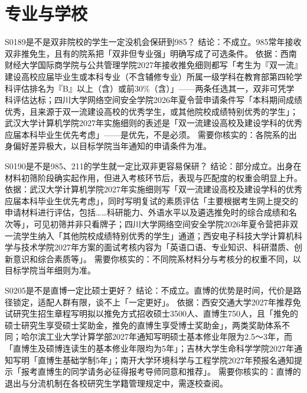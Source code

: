 \section{专业与学校}
\begin{qa}{S0189}{是不是双非院校的学生一定没机会保研到985？}
结论：不成立。985常年接收双非推免生，且有的院系把「双非但专业强」明确写成了可选条件。
依据：西南财经大学国际商学院与公共管理学院2027年接收推免细则都写「考生为『双一流』建设高校应届毕业生或本科专业（不含辅修专业）所属一级学科在教育部第四轮学科评估排名为『B』以上（含）或前30\%（含）」——两条任选其一，双非可凭学科评估达标；四川大学网络空间安全学院2026年夏令营申请条件写「本科期间成绩优秀，且来源于双一流建设高校的优秀学生，或其他院校成绩特别优秀的学生」；武汉大学计算机学院2027年实施细则的表述是「双一流建设高校及建设学科的优秀应届本科毕业生优先考虑」——是优先，不是必须。
需要你核实的：各院系的出身偏好差异极大，以目标学院当年通知的申请条件为准。
\end{qa}

\begin{qa}{S0190}{是不是985、211的学生就一定比双非更容易保研？}
结论：部分成立。出身在材料初筛阶段确实起作用，但进入考核环节后，表现与匹配度的权重会明显上升。
依据：武汉大学计算机学院2027年实施细则写「双一流建设高校及建设学科的优秀应届本科毕业生优先考虑」，同时写明复试的素质评估「主要根据考生网上提交的申请材料进行评估，包括……科研能力、外语水平以及遴选推免时的综合成绩和名次等」，可见初筛并非只看牌子；四川大学网络空间安全学院2026年夏令营把非双一流学生纳入「其他院校成绩特别优秀的学生」通道；西安电子科技大学计算机科学与技术学院2027年方案的面试考核内容为「英语口语、专业知识、科研潜质、创新意识和综合素质等」。
需要你核实的：不同院系材料分与考核分的权重不同，以目标学院当年细则为准。
\end{qa}

\begin{qa}{S0205}{是不是直博一定比硕士更好？}
结论：不成立。直博的优势是时间，代价是路径锁定，适配人群有限，谈不上「一定更好」。
依据：西安交通大学2027年推荐免试研究生招生章程写明拟以推免方式招收硕士3500人、直博生750人，且「推免的硕士研究生享受硕士奖助金，推免的直博生享受博士奖助金」，两类奖助体系不同；哈尔滨工业大学计算学部2027年通知写明硕士基本修业年限为2.5～3年，而「直博生及硕博连读生的基本修业年限均为5年」；吉林大学生命科学学院2027年通知写明「直博生基础学制5年」；南开大学环境科学与工程学院2027年预报名通知提示「报考直博生的同学请务必征得报考导师同意和推荐」。
需要你核实的：直博的退出与分流机制在各校研究生学籍管理规定中，需逐校查阅。
\end{qa}

